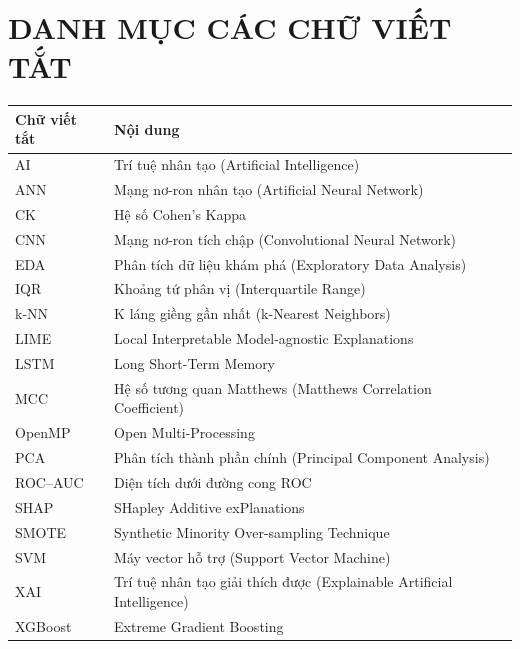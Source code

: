 \chapter*{DANH MỤC CÁC CHỮ VIẾT TẮT}
\begin{longtable}{p{3.2cm}p{10.3cm}}
\textbf{Chữ viết tắt} & \textbf{Nội dung}\\
\hline
AI & Trí tuệ nhân tạo (Artificial Intelligence)\\
ANN & Mạng nơ-ron nhân tạo (Artificial Neural Network)\\
CK & Hệ số Cohen's Kappa\\
CNN & Mạng nơ-ron tích chập (Convolutional Neural Network)\\
EDA & Phân tích dữ liệu khám phá (Exploratory Data Analysis)\\
IQR & Khoảng tứ phân vị (Interquartile Range)\\
k-NN & K láng giềng gần nhất (k-Nearest Neighbors)\\
LIME & Local Interpretable Model-agnostic Explanations\\
LSTM & Long Short-Term Memory\\
MCC & Hệ số tương quan Matthews (Matthews Correlation Coefficient)\\
OpenMP & Open Multi-Processing\\
PCA & Phân tích thành phần chính (Principal Component Analysis)\\
ROC--AUC & Diện tích dưới đường cong ROC\\
SHAP & SHapley Additive exPlanations\\
SMOTE & Synthetic Minority Over-sampling Technique\\
SVM & Máy vector hỗ trợ (Support Vector Machine)\\
XAI & Trí tuệ nhân tạo giải thích được (Explainable Artificial Intelligence)\\
XGBoost & Extreme Gradient Boosting\\
\end{longtable}
